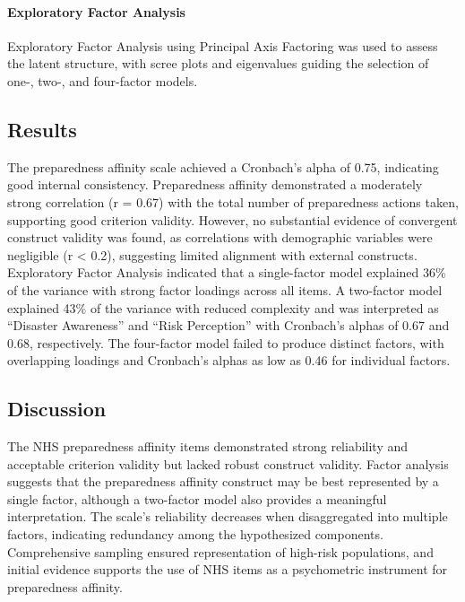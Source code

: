 \documentclass[
  letterpaper,
  DIV=11,
  numbers=noendperiod]{scrartcl}
\let\oldparagraph\paragraph
\renewcommand{\paragraph}[1]{\oldparagraph{#1}\mbox{}}
\begin{document}
\paragraph{Exploratory Factor
Analysis}\label{exploratory-factor-analysis}

Exploratory Factor Analysis using Principal Axis Factoring was used to
assess the latent structure, with scree plots and eigenvalues guiding
the selection of one-, two-, and four-factor models.

\subsection{Results}\label{results}

The preparedness affinity scale achieved a Cronbach's alpha of 0.75,
indicating good internal consistency. Preparedness affinity demonstrated
a moderately strong correlation (r = 0.67) with the total number of
preparedness actions taken, supporting good criterion validity. However,
no substantial evidence of convergent construct validity was found, as
correlations with demographic variables were negligible (r \textless{}
0.2), suggesting limited alignment with external constructs. Exploratory
Factor Analysis indicated that a single-factor model explained 36\% of
the variance with strong factor loadings across all items. A two-factor
model explained 43\% of the variance with reduced complexity and was
interpreted as ``Disaster Awareness'' and ``Risk Perception'' with
Cronbach's alphas of 0.67 and 0.68, respectively. The four-factor model
failed to produce distinct factors, with overlapping loadings and
Cronbach's alphas as low as 0.46 for individual factors.

\subsection{Discussion}\label{discussion}

The NHS preparedness affinity items demonstrated strong reliability and
acceptable criterion validity but lacked robust construct validity.
Factor analysis suggests that the preparedness affinity construct may be
best represented by a single factor, although a two-factor model also
provides a meaningful interpretation. The scale's reliability decreases
when disaggregated into multiple factors, indicating redundancy among
the hypothesized components. Comprehensive sampling ensured
representation of high-risk populations, and initial evidence supports
the use of NHS items as a psychometric instrument for preparedness
affinity.
\end{document}
